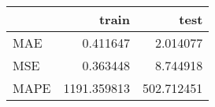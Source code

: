 \begin{tabular}{lrr}
\toprule
{} &        train &        test \\
\midrule
MAE  &     0.411647 &    2.014077 \\
MSE  &     0.363448 &    8.744918 \\
MAPE &  1191.359813 &  502.712451 \\
\bottomrule
\end{tabular}
